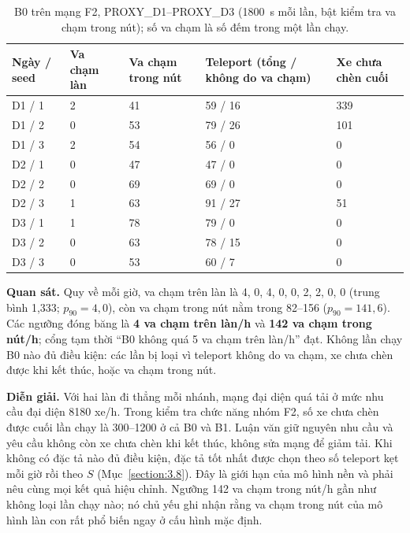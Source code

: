 \documentclass[../main.tex]{subfiles}
\begin{document}
\begin{table}[H]
\centering
\small
\caption{B0 trên mạng F2, PROXY\_D1--PROXY\_D3 (1800~s mỗi lần, bật kiểm tra va chạm trong nút); số va chạm là số đếm trong một lần chạy.} \label{table:4.r28}
\begin{tabular}{|p{1.6cm}|p{1.8cm}|p{2.0cm}|p{3.4cm}|p{2.2cm}|}
\hline
\textbf{Ngày / seed} & \textbf{Va chạm làn} & \textbf{Va chạm trong nút} & \textbf{Teleport (tổng / không do va chạm)} & \textbf{Xe chưa chèn cuối} \\ \hline
D1 / 1 & 2 & 41 & 59 / 16 & 339 \\ \hline
D1 / 2 & 0 & 53 & 79 / 26 & 101 \\ \hline
D1 / 3 & 2 & 54 & 56 / 0 & 0 \\ \hline
D2 / 1 & 0 & 47 & 47 / 0 & 0 \\ \hline
D2 / 2 & 0 & 69 & 69 / 0 & 0 \\ \hline
D2 / 3 & 1 & 63 & 91 / 27 & 51 \\ \hline
D3 / 1 & 1 & 78 & 79 / 0 & 0 \\ \hline
D3 / 2 & 0 & 63 & 78 / 15 & 0 \\ \hline
D3 / 3 & 0 & 53 & 60 / 7 & 0 \\ \hline
\end{tabular}
\end{table}

\textbf{Quan sát.} Quy về mỗi giờ, va chạm trên làn là 4, 0, 4, 0, 0, 2, 2, 0, 0 (trung bình 1,333; $p_{90} = 4{,}0$), còn va chạm trong nút nằm trong 82--156 ($p_{90} = 141{,}6$). Các ngưỡng đóng băng là \textbf{4 va chạm trên làn/h} và \textbf{142 va chạm trong nút/h}; cổng tạm thời ``B0 không quá 5 va chạm trên làn/h'' đạt. Không lần chạy B0 nào đủ điều kiện: các lần bị loại vì teleport không do va chạm, xe chưa chèn được khi kết thúc, hoặc va chạm trong nút.

\textbf{Diễn giải.} Với hai làn đi thẳng mỗi nhánh, mạng đại diện quá tải ở mức nhu cầu đại diện 8180 xe/h. Trong kiểm tra chức năng nhóm F2, số xe chưa chèn được cuối lần chạy là 300--1200 ở cả B0 và B1. Luận văn giữ nguyên nhu cầu và yêu cầu không còn xe chưa chèn khi kết thúc, không sửa mạng để giảm tải. Khi không có đặc tả nào đủ điều kiện, đặc tả tốt nhất được chọn theo số teleport kẹt mỗi giờ rồi theo $S$ (Mục~\ref{section:3.8}). Đây là giới hạn của mô hình nền và phải nêu cùng mọi kết quả hiệu chỉnh. Ngưỡng 142 va chạm trong nút/h gần như không loại lần chạy nào; nó chủ yếu ghi nhận rằng va chạm trong nút của mô hình làn con rất phổ biến ngay ở cấu hình mặc định.
\end{document}
